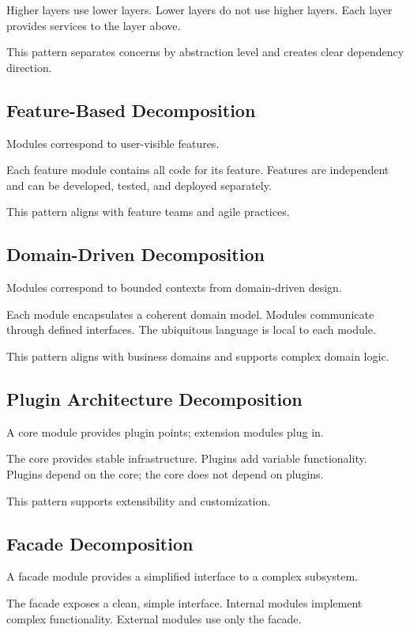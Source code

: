 \documentclass[11pt]{article}
\begin{document}
Higher layers use lower layers. Lower layers do not use higher layers. Each layer provides services to the layer above.

This pattern separates concerns by abstraction level and creates clear dependency direction.

\subsection{Feature-Based Decomposition}

Modules correspond to user-visible features.

Each feature module contains all code for its feature. Features are independent and can be developed, tested, and deployed separately.

This pattern aligns with feature teams and agile practices.

\subsection{Domain-Driven Decomposition}

Modules correspond to bounded contexts from domain-driven design.

Each module encapsulates a coherent domain model. Modules communicate through defined interfaces. The ubiquitous language is local to each module.

This pattern aligns with business domains and supports complex domain logic.

\subsection{Plugin Architecture Decomposition}

A core module provides plugin points; extension modules plug in.

The core provides stable infrastructure. Plugins add variable functionality. Plugins depend on the core; the core does not depend on plugins.

This pattern supports extensibility and customization.

\subsection{Facade Decomposition}

A facade module provides a simplified interface to a complex subsystem.

The facade exposes a clean, simple interface. Internal modules implement complex functionality. External modules use only the facade.
\end{document}
